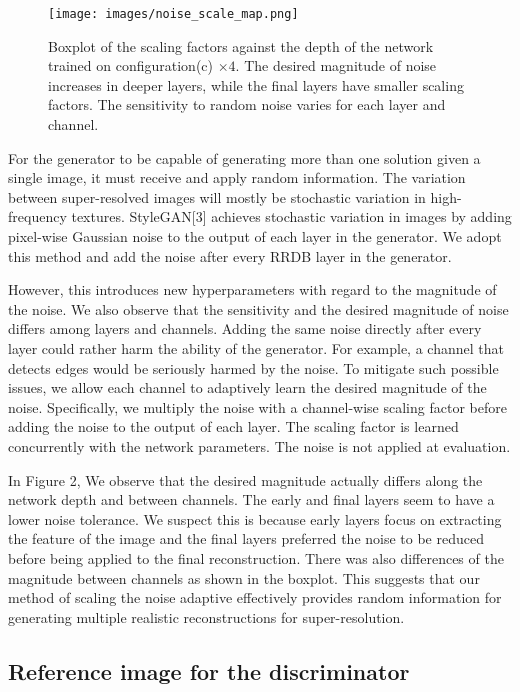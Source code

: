 \documentclass{article}
\begin{document}
\begin{figure}
    \centering
    \texttt{[image: images/noise\_scale\_map.png]}
    \caption{Boxplot of the scaling factors against the depth of the network trained on  configuration(c) $\times4$. The desired magnitude of noise increases in deeper layers, while the final layers have smaller scaling factors. The sensitivity to random noise varies for each layer and channel.}
\end{figure}

For the generator to be capable of generating more than one solution given a single image, it must receive and apply random information. The variation between super-resolved images will mostly be stochastic variation in high-frequency textures. StyleGAN[3] achieves stochastic variation in images by adding pixel-wise Gaussian noise to the output of each layer in the generator. We adopt this method and add the noise after every RRDB layer in the generator. 

However, this introduces new hyperparameters with regard to the magnitude of the noise. We also observe that the sensitivity and the desired magnitude of noise differs among layers and channels. Adding the same noise directly after every layer could rather harm the ability of the generator. For example, a channel that detects edges would be seriously harmed by the noise. To mitigate such possible issues, we allow each channel to adaptively learn the desired magnitude of the noise. Specifically, we multiply the noise with a channel-wise scaling factor before adding the noise to the output of each layer. The scaling factor is learned concurrently with the network parameters. The noise is not applied at evaluation.

In Figure 2, We observe that the desired magnitude actually differs along the network depth and between channels. The early and final layers seem to have a lower noise tolerance. We suspect this is because early layers focus on extracting the feature of the image and the final layers preferred the noise to be reduced before being applied to the final reconstruction. There was also differences of the magnitude between channels as shown in the boxplot. This suggests that our method of scaling the noise adaptive effectively provides random information for generating multiple realistic reconstructions for super-resolution.

\subsection{Reference image for the discriminator}
\end{document}
